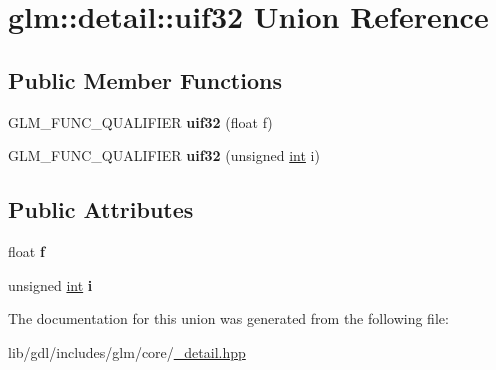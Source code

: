 \hypertarget{unionglm_1_1detail_1_1uif32}{}\section{glm\+:\+:detail\+:\+:uif32 Union Reference}
\label{unionglm_1_1detail_1_1uif32}
\subsection*{Public Member Functions}
\begin{DoxyCompactItemize}
\item 
\hypertarget{unionglm_1_1detail_1_1uif32_ae86c2bd42a88f11e3217d14e46606971}{}G\+L\+M\+\_\+\+F\+U\+N\+C\+\_\+\+Q\+U\+A\+L\+I\+F\+I\+E\+R {\bfseries uif32} (float f)\label{unionglm_1_1detail_1_1uif32_ae86c2bd42a88f11e3217d14e46606971}

\item 
\hypertarget{unionglm_1_1detail_1_1uif32_af13a824828bd9601e53204ede38377da}{}G\+L\+M\+\_\+\+F\+U\+N\+C\+\_\+\+Q\+U\+A\+L\+I\+F\+I\+E\+R {\bfseries uif32} (unsigned \hyperlink{_s_d_l__thread_8h_a6a64f9be4433e4de6e2f2f548cf3c08e}{int} i)\label{unionglm_1_1detail_1_1uif32_af13a824828bd9601e53204ede38377da}

\end{DoxyCompactItemize}
\subsection*{Public Attributes}
\begin{DoxyCompactItemize}
\item 
\hypertarget{unionglm_1_1detail_1_1uif32_a5f697f84c5a8ec72c2f3a4f705f5bde8}{}float {\bfseries f}\label{unionglm_1_1detail_1_1uif32_a5f697f84c5a8ec72c2f3a4f705f5bde8}

\item 
\hypertarget{unionglm_1_1detail_1_1uif32_aff30e33bee63b0b9d1e930f0814da872}{}unsigned \hyperlink{_s_d_l__thread_8h_a6a64f9be4433e4de6e2f2f548cf3c08e}{int} {\bfseries i}\label{unionglm_1_1detail_1_1uif32_aff30e33bee63b0b9d1e930f0814da872}

\end{DoxyCompactItemize}


The documentation for this union was generated from the following file\+:\begin{DoxyCompactItemize}
\item 
lib/gdl/includes/glm/core/\hyperlink{__detail_8hpp}{\+\_\+detail.\+hpp}\end{DoxyCompactItemize}
